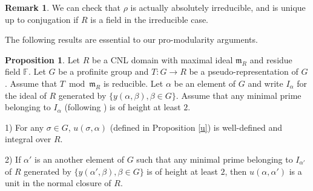 \documentclass[12pt]{amsart}
\theoremstyle{plain}
\theoremstyle{definition}
\newtheorem{rem}[thm]{Remark}
\newtheorem{prop}[thm]{Proposition}
\theoremstyle{remark}
\begin{document}
\begin{rem}
	We can check that $\rho$ is actually absolutely irreducible, and is unique up to conjugation if $R$ is a field in the irreducible case.
\end{rem}

The following results are essential to our pro-modularity arguments.

\begin{prop}\label{innovation}
	Let $R$ be a CNL domain with maximal ideal $\mathfrak{m}_R$ and residue field $\mathbb{F}$. Let $G$ be a profinite group and $T: G \to R$ be a pseudo-representation of $G$. Assume that $T~\operatorname{mod}~\mathfrak{m}_R$ is reducible. Let $\alpha$ be an element of $G $ and write $I_{\alpha}$ for the ideal of $R$ generated by $\{y(\alpha, \beta), \beta \in G\}$. Assume that any minimal prime belonging to $I_{\alpha}$ (following \cite[page 52]{MR242802}) is of height at least $2$.
	
	1) For any $\sigma \in G$, $u(\sigma, \alpha)$ (defined in Proposition \ref{u}) is well-defined and integral over $R$.
	
	2) If $\alpha'$ is an another element of $G $ such that any minimal prime belonging to $I_{\alpha'}$ of $R$ generated by $\{y(\alpha', \beta), \beta \in G\}$ is of height at least $2$, then $u(\alpha, \alpha')$ is a unit in the normal closure of $R$.
\end{prop}
\end{document}
